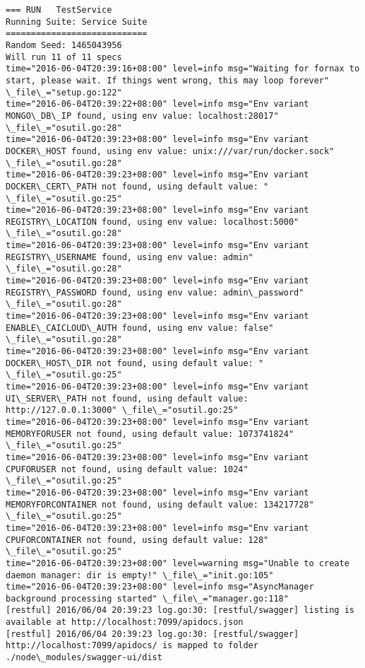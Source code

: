 \begin{lstlisting}[caption={Fornax功能性测试日志}]
=== RUN   TestService
Running Suite: Service Suite
============================
Random Seed: 1465043956
Will run 11 of 11 specs
time="2016-06-04T20:39:16+08:00" level=info msg="Waiting for fornax to start, please wait. If things went wrong, this may loop forever" \_file\_="setup.go:122" 
time="2016-06-04T20:39:22+08:00" level=info msg="Env variant MONGO\_DB\_IP found, using env value: localhost:28017" \_file\_="osutil.go:28" 
time="2016-06-04T20:39:23+08:00" level=info msg="Env variant DOCKER\_HOST found, using env value: unix:///var/run/docker.sock" \_file\_="osutil.go:28" 
time="2016-06-04T20:39:23+08:00" level=info msg="Env variant DOCKER\_CERT\_PATH not found, using default value: " \_file\_="osutil.go:25" 
time="2016-06-04T20:39:23+08:00" level=info msg="Env variant REGISTRY\_LOCATION found, using env value: localhost:5000" \_file\_="osutil.go:28" 
time="2016-06-04T20:39:23+08:00" level=info msg="Env variant REGISTRY\_USERNAME found, using env value: admin" \_file\_="osutil.go:28" 
time="2016-06-04T20:39:23+08:00" level=info msg="Env variant REGISTRY\_PASSWORD found, using env value: admin\_password" \_file\_="osutil.go:28" 
time="2016-06-04T20:39:23+08:00" level=info msg="Env variant ENABLE\_CAICLOUD\_AUTH found, using env value: false" \_file\_="osutil.go:28" 
time="2016-06-04T20:39:23+08:00" level=info msg="Env variant DOCKER\_HOST\_DIR not found, using default value: " \_file\_="osutil.go:25" 
time="2016-06-04T20:39:23+08:00" level=info msg="Env variant UI\_SERVER\_PATH not found, using default value: http://127.0.0.1:3000" \_file\_="osutil.go:25" 
time="2016-06-04T20:39:23+08:00" level=info msg="Env variant MEMORYFORUSER not found, using default value: 1073741824" \_file\_="osutil.go:25" 
time="2016-06-04T20:39:23+08:00" level=info msg="Env variant CPUFORUSER not found, using default value: 1024" \_file\_="osutil.go:25" 
time="2016-06-04T20:39:23+08:00" level=info msg="Env variant MEMORYFORCONTAINER not found, using default value: 134217728" \_file\_="osutil.go:25" 
time="2016-06-04T20:39:23+08:00" level=info msg="Env variant CPUFORCONTAINER not found, using default value: 128" \_file\_="osutil.go:25" 
time="2016-06-04T20:39:23+08:00" level=warning msg="Unable to create daemon manager: dir is empty!" \_file\_="init.go:105" 
time="2016-06-04T20:39:23+08:00" level=info msg="AsyncManager background processing started" \_file\_="manager.go:118" 
[restful] 2016/06/04 20:39:23 log.go:30: [restful/swagger] listing is available at http://localhost:7099/apidocs.json
[restful] 2016/06/04 20:39:23 log.go:30: [restful/swagger] http://localhost:7099/apidocs/ is mapped to folder ./node\_modules/swagger-ui/dist

\end{lstlisting}
